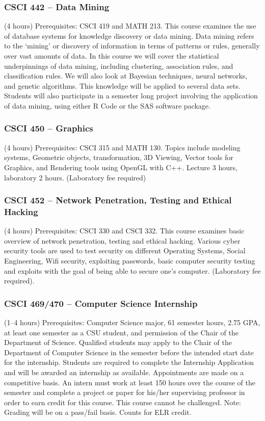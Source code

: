 \subsubsection{CSCI 442 -- Data Mining}
(4 hours) Prerequisites: CSCI 419 and MATH 213. This course examines the use of database systems for knowledge discovery or data mining. Data mining refers to the ‘mining’ or discovery of information in terms of patterns or rules, generally over vast amounts of data. In this course we will cover the statistical underpinnings of data mining, including clustering, association rules, and classification rules. We will also look at Bayesian techniques, neural networks, and genetic algorithms. This knowledge will be applied to several data sets. Students will also participate in a semester long project involving the application of data mining, using either R Code or the SAS software package.

\subsubsection{CSCI 450 -- Graphics}
(4 hours) Prerequisites: CSCI 315 and MATH 130. Topics include modeling systems, Geometric objects, transformation, 3D Viewing, Vector tools for Graphics, and Rendering tools using OpenGL with C++. Lecture 3 hours, laboratory 2 hours. (Laboratory fee required)

\subsubsection{CSCI 452 -- Network Penetration, Testing and Ethical Hacking}
(4 hours) Prerequisites: CSCI 330 and CSCI 332. This course examines basic overview of network penetration, testing and ethical hacking. Various cyber security tools are used to test security on different Operating Systems, Social Engineering, Wifi security, exploiting passwords, basic computer security testing and exploits with the goal of being able to secure one’s computer. (Laboratory fee required).

\subsubsection{CSCI 469/470 -- Computer Science Internship}
(1--4 hours) Prerequisites: Computer Science major, 61 semester hours, 2.75 GPA, at least one semester as a CSU student, and permission of the Chair of the Department of Science. Qualified students may apply to the Chair of the Department of Computer Science in the semester before the intended start date for the internship. Students are required to complete the Internship Application and will be awarded an internship as available. Appointments are made on a competitive basis. An intern must work at least 150 hours over the course of the semester and complete a project or paper for his/her supervising professor in order to earn credit for this course. This course cannot be challenged. Note: Grading will be on a pass/fail basis. Counts for ELR credit.

